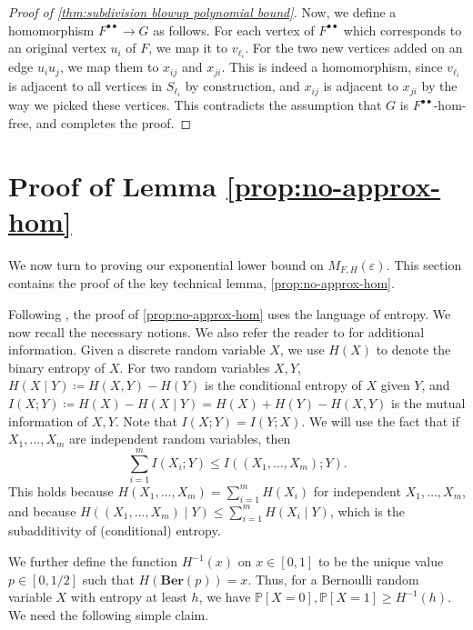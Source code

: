 \documentclass[reqno, english, 12pt]{amsart}
\theoremstyle{plain}
\theoremstyle{remark}
\renewcommand{\leq}{\leqslant}
\renewcommand{\geq}{\geqslant}
\newcommand{\Prob}{\mathbb{P}}
\newcommand{\Ber}{\textbf{Ber}}
\begin{document}
\begin{proof}[Proof of \cref{thm:subdivision blowup polynomial bound}]
	Now, we define a homomorphism $F^{\bullet \bullet} \to G$ as follows. For each vertex of $F^{\bullet \bullet}$ which corresponds to an original vertex $u_i$ of $F$, we map it to $v_{\ell_i}$. For the two new vertices added on an edge $u_{i}u_j$, we map them to $x_{ij}$ and $x_{ji}$. This is indeed a homomorphism, since $v_{\ell_i}$ is adjacent to all vertices in $S_{\ell_i}$ by construction, and $x_{ij}$ is adjacent to $x_{ji}$ by the way we picked these vertices. This contradicts the assumption that $G$ is $F^{\bullet \bullet}$-hom-free, and completes the proof.
\end{proof}



\section{Proof of Lemma \ref{prop:no-approx-hom}}\label{sec:key lemma proof}
We now turn to proving our exponential lower bound on $M_{F,H}(\varepsilon)$. This section contains the proof of the key technical lemma, \cref{prop:no-approx-hom}.

Following \cite{FZ}, the proof of \cref{prop:no-approx-hom}  uses the language of entropy. We now recall the necessary notions. We also refer the reader to \cite[Section 2]{Galvin} for additional information.
Given a discrete random variable $X$, we use $H(X)$ to denote the binary entropy of $X$. For two random variables $X,Y$, $H(X \mid Y) \coloneqq H(X,Y) - H(Y)$ is the conditional entropy of $X$ given $Y$, and $I(X; Y) \coloneqq H(X) - H(X\mid Y) = H(X) + H(Y) - H(X,Y)$ is the mutual information of $X,Y$. 
Note that $I(X;Y) = I(Y;X)$.
We will use the fact that if $X_1,\dots,X_m$ are independent random variables, then
\begin{equation}\label{eq:mutual information supermodularity}
\sum_{i=1}^m I(X_i;Y) \leq I((X_1,\dots,X_m);Y).
\end{equation}
This holds because $H(X_1,\dots,X_m) = \sum_{i=1}^m H(X_i)$ for independent $X_1,\dots,X_m$, and because
$H((X_1,\dots,X_m) \mid Y) \leq \sum_{i=1}^m H(X_i \mid Y)$, which is the subadditivity of (conditional) entropy.

We further define the function $H^{-1}(x)$ on $x\in [0,1]$ to be the unique value $p\in [0,1/2]$ such that $H(\Ber(p)) = x$.
Thus, for a Bernoulli random variable $X$ with entropy at least $h$, we have $\Prob[X=0],\Prob[X=1] \geq H^{-1}(h)$.
We need the following simple claim.
\end{document}

